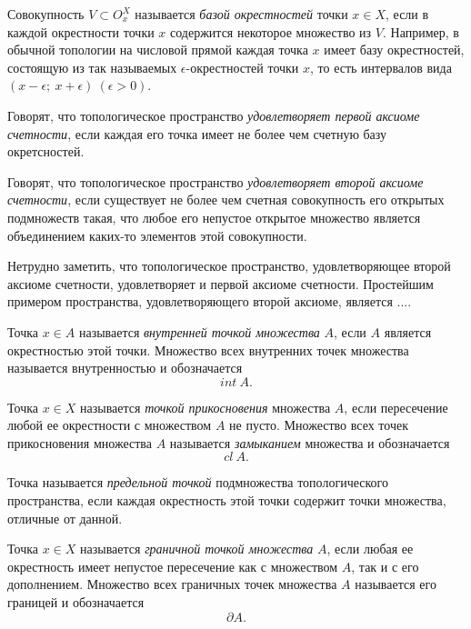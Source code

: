 \begin{definition}
	Совокупность $V \subset O_{x}^{X} $ называется \emph{базой окрестностей} точки $x \in X$, если в каждой окрестности точки $x$ содержится некоторое множество из $V$. Например, в обычной топологии на числовой прямой каждая точка $x$ имеет базу окрестностей, состоящую из так называемых $\epsilon $-окрестностей точки $x$, то есть интервалов вида $(x - \epsilon ; \ x + \epsilon ) \ (\epsilon > 0)$.
\end{definition}

\begin{definition}
	Говорят, что топологическое пространство \emph{удовлетворяет первой аксиоме счетности}, если каждая его точка имеет не более чем счетную базу окретсностей.
\end{definition}

\begin{definition}
	Говорят, что топологическое пространство \emph{удовлетворяет второй аксиоме счетности}, если существует не более чем счетная совокупность его открытых подмножеств такая, что любое его непустое открытое множество является объединением каких-то элементов этой совокупности.
\end{definition}

\begin{remark}
	Нетрудно заметить, что топологическое пространство, удовлетворяющее второй аксиоме счетности, удовлетворяет и первой аксиоме счетности. Простейшим примером пространства, удовлетворяющего второй аксиоме, является ....
\end{remark}

\begin{definition}
	Точка $x \in A$ называется \emph{внутренней точкой множества} $A$, если $A$ является окрестностью этой точки. Множество всех внутренних точек множества называется внутренностью и обозначается
	\[
		int \ A.
	\]
\end{definition}

\begin{definition}
	Точка $x \in X$ называется \emph{точкой прикосновения} множества $A$, если пересечение любой ее окрестности с множеством $A$ не пусто. Множество всех точек прикосновения множества $A$ называется \emph{замыканием} множества и обозначается
	\[
		cl \ A.
	\]
\end{definition}

\begin{definition}
	Точка называется \emph{предельной точкой} подмножества топологического пространства, если каждая окрестность этой точки содержит точки множества, отличные от данной.
\end{definition}

\begin{definition}
	Точка $x \in X$ называется \emph{граничной точкой множества} $A$, если любая ее окрестность имеет непустое пересечение как с множеством $A$, так и с его дополнением. Множество всех граничных точек множества $A$ называется его границей и обозначается
	\[
		\partial A.
	\]
\end{definition}
